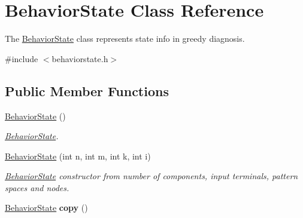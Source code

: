 \hypertarget{class_behavior_state}{}\section{Behavior\+State Class Reference}
\label{class_behavior_state}


The \hyperlink{class_behavior_state}{Behavior\+State} class represents state info in greedy diagnosis.  




{\ttfamily \#include $<$behaviorstate.\+h$>$}

\subsection*{Public Member Functions}
\begin{DoxyCompactItemize}
\item 
\hyperlink{class_behavior_state_ae98eb22c5e7cf17f287177b96a737b03}{Behavior\+State} ()\hypertarget{class_behavior_state_ae98eb22c5e7cf17f287177b96a737b03}{}\label{class_behavior_state_ae98eb22c5e7cf17f287177b96a737b03}

\begin{DoxyCompactList}\small\item\em \hyperlink{class_behavior_state}{Behavior\+State}. \end{DoxyCompactList}\item 
\hyperlink{class_behavior_state_a3e13fbeed6b1db2a40b4b01fc879b623}{Behavior\+State} (int n, int m, int k, int i)
\begin{DoxyCompactList}\small\item\em \hyperlink{class_behavior_state}{Behavior\+State} constructor from number of components, input terminals, pattern spaces and nodes. \end{DoxyCompactList}\item 
\hyperlink{class_behavior_state}{Behavior\+State} {\bfseries copy} ()\hypertarget{class_behavior_state_a6a97b20cd2230a5f1da4d654d825bbe0}{}\label{class_behavior_state_a6a97b20cd2230a5f1da4d654d825bbe0}


\end{DoxyCompactItemize}
